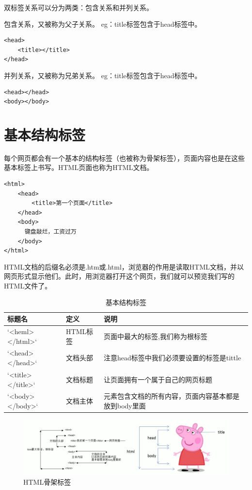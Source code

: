 \documentclass[
]{book}
\begin{document}
双标签关系可以分为两类：包含关系和并列关系。

包含关系，又被称为父子关系。
eg：title标签包含于head标签中。

\begin{verbatim}
<head>
    <title></title>
</head>
\end{verbatim}

并列关系，又被称为兄弟关系。
eg：title标签包含于head标签中。

\begin{verbatim}
<head></head>
<body></body>
\end{verbatim}

\hypertarget{ux57faux672cux7ed3ux6784ux6807ux7b7e}{%
\section{基本结构标签}\label{ux57faux672cux7ed3ux6784ux6807ux7b7e}}

每个网页都会有一个基本的结构标签（也被称为骨架标签），页面内容也是在这些基本标签上书写。HTML页面也称为HTML文档。

\begin{verbatim}
<html>
    <head>     
        <title>第一个页面</title> 
    </head>
    <body>
      键盘敲烂，工资过万
    </body>
</html>
\end{verbatim}

HTML文档的后缀名必须是.htm或.html，浏览器的作用是读取HTML文档，并以网页形式显示他们。此时，用浏览器打开这个网页，我们就可以预览我们写的HTML文件了。

\begin{table}

\caption{\label{tab:unnamed-chunk-1}基本结构标签}
\centering
\begin{tabular}[t]{lll}
\toprule
标题名 & 定义 & 说明\\
\midrule
`<heml></html>` & HTML标签 & 页面中最大的标签,我们称为根标签\\
`<head></head>` & 文档头部 & 注意head标签中我们必须要设置的标签是tittle\\
`<title></title>` & 文档标题 & 让页面拥有一个属于自己的网页标题\\
`<body></body>` & 文档主体 & 元素包含文档的所有内容，页面内容基本都是放到body里面\\
\bottomrule
\end{tabular}
\end{table}

\begin{figure}

{\centering \includegraphics{fig/1-2} 

}

\caption{HTML骨架标签}\label{fig:unnamed-chunk-2}
\end{figure}
\end{document}
